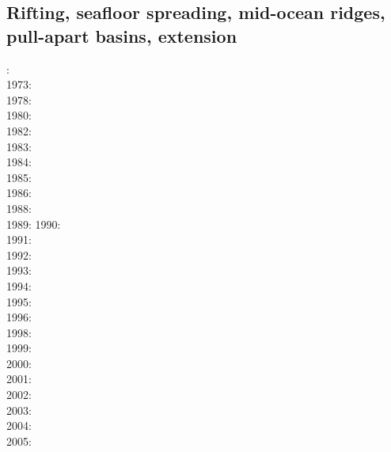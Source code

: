 \subsection{Rifting, seafloor spreading, mid-ocean ridges, pull-apart basins, extension}

{\scriptsize
{}: \cite{lath72}\\
1973: \cite{froi73}\\
1978: \cite{stei78}\cite{mcke78}\\
1980: \cite{bran80}\\
1982: \cite{bekb82}\\
1983: \cite{engl83}\\
1984: \cite{poay84}\\
1985: \cite{bosw85}\\
1986: \cite{hoen86b}\cite{zupf86}\cite{zupa86}\cite{mofr86}\cite{mcke86}\cite{buck86}\\
1988: \cite{bums88}\\
1989: \cite{mewi89}\cite{brbe89}\cite{ismb89}\cite{soen89}\cite{brbe89b}\cite{brbe89c}
1990: \cite{fara90}\cite{lipa90}\cite{mccl90}\cite{chmo90}\cite{chmo90b}\\
1991: \cite{trbr91}\cite{buck91}\\
1992: \cite{zieg92b}\cite{egan92}\\
1993: \cite{gowo93}\\
1994: \cite{trca94}\cite{jhpp94}\\
1995: \cite{gowo95}\cite{katl95}\\
1996: \cite{dusa96}\cite{beda96}\cite{mada96}\\
1998: \cite{rafm98}\\
1999: \cite{brun99}\cite{bulp99}\cite{gowo99}\\
2000: \cite{scth00}\\
2001: \cite{hupc01}\cite{hupc01b}\cite{frbr01}\cite{frnb01a}\cite{frnb01b}\\
2002: \cite{hube02}\cite{hani02}\cite{dabm02}\cite{vacl02}\cite{belz02}\cite{hupc02}
      \cite{hube02b}\cite{vacl02}\cite{labu02}\\
2003: \cite{hube03}\cite{hani03}\cite{covb03}\cite{wibm03}\\
2004: \cite{hier04}\cite{sees04}\\
2005: \cite{hubb05}\cite{coub05}\cite{vanw05}\cite{vabl05}\\
}
